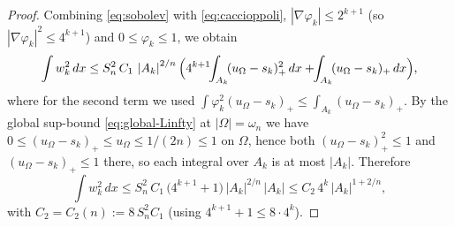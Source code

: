 \documentclass[11pt]{amsart}
\theoremstyle{definition}
\newcommand{\Om}{\Omega}
\newcommand{\abs}[1]{\left|#1\right|}
\newcommand{\dx}{\,dx}
\begin{document}
\begin{proof}
Combining \eqref{eq:sobolev} with \eqref{eq:caccioppoli},
$\abs{\nabla\varphi_k}\le2^{k+1}$ (so $\abs{\nabla\varphi_k}^2\le4^{k+1}$)
and $0\le\varphi_k\le1$, we obtain
\begin{equation}\label{eq:after-sobolev}
   \int w_k^2\dx
   \le S_n^2\,C_1\,\abs{A_k}^{2/n}
   \Bigl(4^{k+1}\!\!\int_{A_k}\!(u_\Om-s_k)_+^2\dx
        +\!\!\int_{A_k}\!(u_\Om-s_k)_+\dx\Bigr),
\end{equation}
where for the second term we used
$\int\varphi_k^2(u_\Om-s_k)_+\le\int_{A_k}(u_\Om-s_k)_+$.
By the global
sup-bound \eqref{eq:global-Linfty} at $\abs{\Om}=\omega_n$ we have
$0\le(u_\Om-s_k)_+\le u_\Om\le1/(2n)\le1$ on $\Om$, hence both
$(u_\Om-s_k)_+^2\le1$ and $(u_\Om-s_k)_+\le1$ there, so each integral over
$A_k$ is at most $\abs{A_k}$. Therefore
\begin{equation}\label{eq:after-sobolev2}
   \int w_k^2\dx
   \le S_n^2\,C_1\,\bigl(4^{k+1}+1\bigr)\,\abs{A_k}^{2/n}\,\abs{A_k}
   \le C_2\,4^{k}\,\abs{A_k}^{1+2/n},
\end{equation}
with $C_2=C_2(n):=8\,S_n^2 C_1$ (using $4^{k+1}+1\le8\cdot4^{k}$).


\end{proof}
\end{document}
